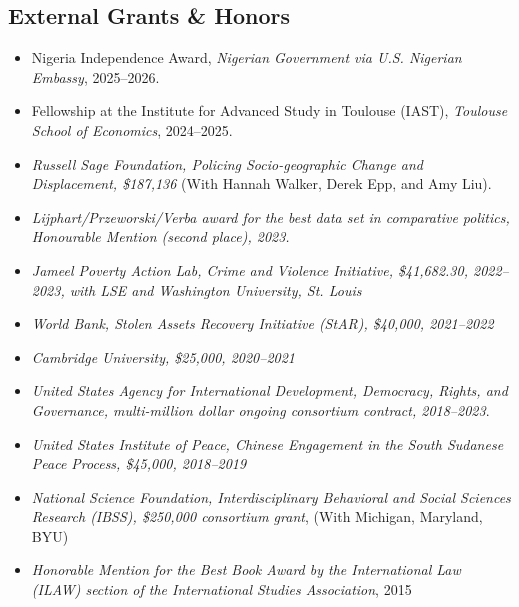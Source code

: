 \documentclass[10pt]{article}
\begin{document}
\subsection*{External Grants \& Honors}

\begin{itemize}\setlength{\itemsep}{1pt}

\item Nigeria Independence Award, \textit{Nigerian Government via U.S. Nigerian Embassy}, 2025--2026.

\item Fellowship at the Institute for Advanced Study in Toulouse (IAST), \textit{Toulouse School of Economics}, 2024--2025.

\item \textit{Russell Sage Foundation, Policing Socio-geographic Change and Displacement, \$187,136} (With Hannah Walker, Derek Epp, and Amy Liu). 

\item \textit{Lijphart/Przeworski/Verba award for the best data set in comparative politics, Honourable Mention (second place), 2023.}

\item \textit{Jameel Poverty Action Lab, Crime and Violence Initiative, \$41,682.30, 2022--2023, with LSE and Washington University, St. Louis}

\item \textit{World Bank, Stolen Assets Recovery Initiative (StAR), \$40,000, 2021--2022}

\item \textit{Cambridge University, \$25,000, 2020--2021}

\item \textit{United States Agency for International Development, Democracy, Rights, and Governance, multi-million dollar ongoing consortium contract, 2018--2023}.

\item \textit{United States Institute of Peace, Chinese Engagement in the South Sudanese Peace Process, \$45,000, 2018--2019}

\item \textit{National Science Foundation, Interdisciplinary Behavioral and Social Sciences Research (IBSS), \$250,000 consortium grant}, (With Michigan, Maryland, BYU)

\item \textit{Honorable Mention for the Best Book Award by the International Law (ILAW) section of the International Studies Association}, 2015


\end{itemize}
\end{document}
